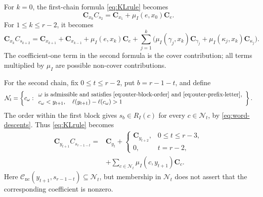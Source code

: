 \documentclass[11pt,a4paper,reqno]{amsart}
\numberwithin{equation}{section}
\theoremstyle{definition}
\theoremstyle{remark}
\theoremstyle{plain}
\newcommand{\C}{\mathbf C}
\newcommand{\mus}{\mu_I}
\begin{document}
For $k=0$, the first-chain formula \eqref{eq:KLrule} becomes
\begin{equation}\label{eq:first-chain-initial-candidate-expansion}
 \C_{x_0}C_{s_2}=\C_{x_1}+\mus(e,x_0)\C_e.
\end{equation}
For $1\leq k\leq r-2$, it becomes
\begin{equation}\label{eq:first-chain-candidate-expansion}
 \C_{x_k}C_{s_{k+2}}
 =\C_{x_{k+1}}+\C_{x_{k-1}}
 +\mus(e,x_k)\C_e
 +\sum_{j=1}^{k}\bigl(
   \mus(\gamma_j,x_k)\C_{\gamma_j}
   +\mus(\kappa_j,x_k)\C_{\kappa_j}\bigr).
\end{equation}
The coefficient-one term in the second formula is the cover
contribution; all terms multiplied by $\mus$ are possible non-cover
contributions.

For the second chain, fix $0\leq t\leq r-2$, put $b=r-1-t$, and define
\begin{equation}\label{eq:remaining-second-chain-indices}
 \mathcal N_t=
 \left\{c_\omega:
 \begin{array}{l}
  \omega\text{ is admissible and satisfies }
  \eqref{eq:outer-block-order}\text{ and }\eqref{eq:outer-prefix-letter},\\
  c_\omega<y_{t+1},\quad
  \ell(y_{t+1})-\ell(c_\omega)>1
 \end{array}
 \right\}.
\end{equation}
The order within the first block gives $s_b\in R_I(c)$ for every
$c\in\mathcal N_t$, by \eqref{eq:word-descents}.
Thus \eqref{eq:KLrule} becomes
\begin{equation}\label{eq:second-chain-candidate-expansion}
\begin{aligned}
 \C_{y_{t+1}}C_{s_{r-1-t}}
 ={}&\C_{y_t}
 +\begin{cases}
\C_{y_{t+2}},&0\leq t\leq r-3,\\
  0,&t=r-2,
 \end{cases}\\
 &+\sum_{c\in\mathcal N_t}\mus(c,y_{t+1})\C_c.
\end{aligned}
\end{equation}
Here $\mathcal C_{\mathrm{nc}}(y_{t+1},s_{r-1-t})\subseteq
\mathcal N_t$, but membership in $\mathcal N_t$ does not assert
that the corresponding coefficient is nonzero.

\end{document}
